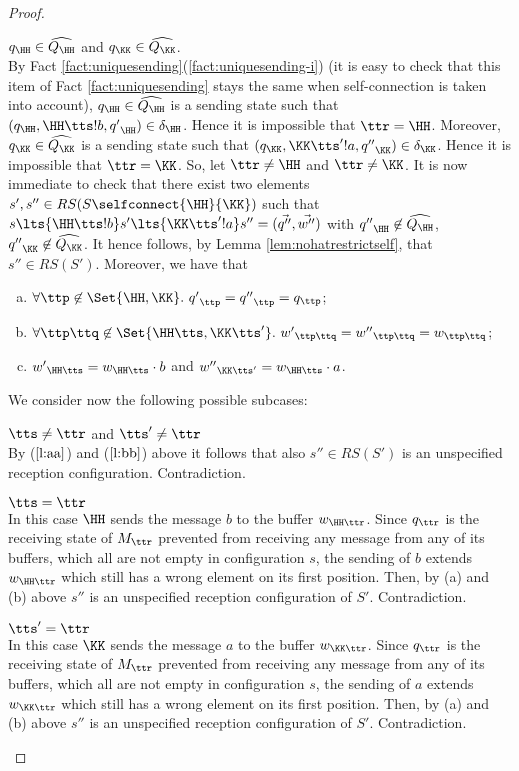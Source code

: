 \begin{proof}
\begin{description}
\item 
${q}_\HH\in \widehat{Q_\HH}$ and ${q}_\KK\in \widehat{Q_\KK}$.\\ 
By Fact \ref{fact:uniquesending}(\ref{fact:uniquesending-i}) (it is easy to check that this item of Fact \ref{fact:uniquesending} stays the same when self-connection is taken into account),
${q}_\HH\in \widehat{Q_\HH}$ is a sending state such that $({q}_\HH,\HH\tts!b,{q'}_\HH)\in{\delta}_\HH$. Hence it is impossible that $\ttr=\HH$. Moreover, ${q}_\KK\in \widehat{Q_\KK}$ is a sending state such that $({q}_\KK,\KK\tts'!a,{q''}_\KK)\in{\delta}_\KK$. Hence it is impossible that $\ttr=\KK$.
So, let $\ttr\neq\HH$ and $\ttr\neq\KK$.
It is now immediate to check that  there exist two elements $s',s''\in RS(S\selfconnect{\HH}{\KK})$ such that
$s\lts{\HH\tts!b}s'\lts{\KK\tts'!a}s''=(\vec{q''},\vec{w''})$ with ${q''}_\HH\not\in \widehat{Q_\HH}$,
${q''}_\KK\not\in \widehat{Q_\KK}$.
It hence follows, by Lemma \ref{lem:nohatrestrictself}, that $s''\in RS(S')$.
Moreover, we have that 
\begin{enumerate}[a)]
\item
\label{l:aa}
$\forall \ttp\not\in\Set{\HH,\KK}.\ {q'}_\ttp = {q''}_\ttp ={q}_\ttp$;
\item
\label{l:bb}
$\forall \ttp\ttq \not\in \Set{\HH\tts, \KK\tts'}.\ {w'}_{\ttp\ttq} = {w''}_{\ttp\ttq} = {w}_{\ttp\ttq}$;
\item
\label{l:cc}
${w'}_{\HH\tts} ={w}_{\HH\tts} \cdot b$ and ${w''}_{\KK\tts'} = {w}_{\HH\tts}\cdot a$.
\end{enumerate}
We consider now the following possible subcases:
\begin{description}
\item
$\tts\neq\ttr$ and $\tts'\neq\ttr$\\
By ($\ref{l:aa}$) and ($\ref{l:bb}$) above it follows that  also $s''\in RS(S')$ is an unspecified reception configuration. Contradiction.
\item
$\tts=\ttr$\\
In this case $\HH$ sends the message $b$ to the buffer $w_{\HH\ttr}$. Since $q_\ttr$ is the receiving state of $M_\ttr$ prevented from receiving any message from any of its buffers, which all are not empty in configuration $s$, the sending of $b$ extends $w_{\HH\ttr}$ which still has a wrong element on its first position. Then, by (a) and (b) above $s''$ is an unspecified reception configuration of $S'$.  Contradiction.
\item
$\tts'=\ttr$\\
In this case $\KK$ sends the message $a$ to the buffer $w_{\KK\ttr}$. Since $q_\ttr$ is the receiving state of $M_\ttr$ prevented from receiving any message from any of its buffers, which all are not empty in configuration $s$, the sending of $a$ extends $w_{\KK\ttr}$ which still has a wrong element on its first position. Then, by (a) and (b) above $s''$ is an unspecified reception configuration of $S'$.  Contradiction.


\end{description}
\end{description}
\end{proof}
